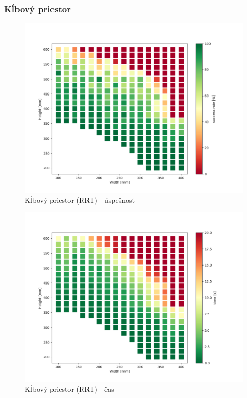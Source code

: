 \subsubsection{Kĺbový priestor}

\begin{figure}[h]
	\centering
	\includegraphics[width=140mm]{img/3Q-size.png}
	\caption{Kĺbový priestor (RRT) - úspešnosť} \label{OBRAZOK 5.1.7} 
\end{figure} 

\begin{figure}[h]
	\centering
	\includegraphics[width=140mm]{img/3Q-time.png}
	\caption{Kĺbový priestor (RRT) - čas} \label{OBRAZOK 5.1.8} 
\end{figure} 

